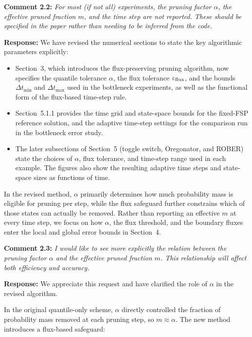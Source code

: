 \documentclass[11pt]{article}
\begin{document}
\noindent\textbf{Comment 2.2:} \textit{For most (if not all) experiments, the pruning factor $\alpha$, the
effective pruned fraction $m$, and the time step are not reported. These should
be specified in the paper rather than needing to be inferred from the code.}

\textbf{Response:} We have revised the numerical sections to state the key algorithmic
parameters explicitly:

\begin{itemize}
  \item Section~3, which introduces the flux-preserving pruning algorithm, now
        specifies the quantile tolerance $\alpha$, the flux tolerance
        $\varepsilon_{\rm flux}$, and the bounds $\Delta t_{\min}$ and
        $\Delta t_{\max}$ used in the bottleneck experiments, as well as the
        functional form of the flux-based time-step rule.
  \item Section~5.1.1 provides the time grid and state-space bounds for the
        fixed-FSP reference solution, and the adaptive time-step settings for the
        comparison run in the bottleneck error study.
  \item The later subsections of Section~5 (toggle switch, Oregonator, and ROBER)
        state the choices of $\alpha$, flux tolerance, and time-step range used in
        each example. The figures also show the resulting adaptive time steps and
        state-space sizes as functions of time.
\end{itemize}

In the revised method, $\alpha$ primarily determines how much probability mass is
eligible for pruning per step, while the flux safeguard further constrains which
of those states can actually be removed. Rather than reporting an effective $m$ at
every time step, we focus on how $\alpha$, the flux threshold, and the boundary
fluxes enter the local and global error bounds in Section~4.

\medskip

\noindent\textbf{Comment 2.3:} \textit{I would like to see more explicitly the relation between the pruning
factor $\alpha$ and the effective pruned fraction $m$. This relationship will
affect both efficiency and accuracy.}

\textbf{Response:} We appreciate this request and have clarified the role of $\alpha$
in the revised algorithm.

In the original quantile-only scheme, $\alpha$ directly controlled the fraction of
probability mass removed at each pruning step, so $m \approx \alpha$. The new
method introduces a flux-based safeguard:
\end{document}
